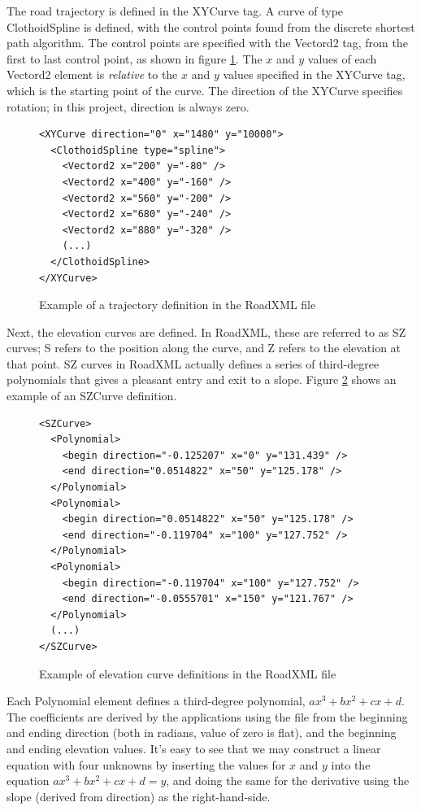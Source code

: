 The road trajectory is defined in the XYCurve tag\cite{roadxml}. A curve of type ClothoidSpline is defined, with the control points found from the discrete shortest path algorithm. The control points are specified with the Vectord2 tag, from the first to last control point, as shown in figure \ref{fig:roadxml_controlpoints}. The $x$ and $y$ values of each Vectord2 element is \textit{relative} to the $x$ and $y$ values specified in the XYCurve tag, which is the starting point of the curve. The direction of the XYCurve specifies rotation; in this project, direction is always zero.

\begin{figure}[ht]
\centering
\begin{verbatim}
<XYCurve direction="0" x="1480" y="10000">
  <ClothoidSpline type="spline">
    <Vectord2 x="200" y="-80" />
    <Vectord2 x="400" y="-160" />
    <Vectord2 x="560" y="-200" />
    <Vectord2 x="680" y="-240" />
    <Vectord2 x="880" y="-320" />
    (...)
  </ClothoidSpline>
</XYCurve>
\end{verbatim}
\caption{Example of a trajectory definition in the RoadXML file}
\label{fig:roadxml_controlpoints}
\end{figure}

Next, the elevation curves are defined. In RoadXML, these are referred to as SZ curves; S refers to the position along the curve, and Z refers to the elevation at that point. SZ curves in RoadXML actually defines a series of third-degree polynomials that gives a pleasant entry and exit to a slope. Figure \ref{fig:roadxml_elevation_curves} shows an example of an SZCurve definition. 

\begin{figure}[ht]
\centering
\begin{verbatim}
<SZCurve>
  <Polynomial>
    <begin direction="-0.125207" x="0" y="131.439" />
    <end direction="0.0514822" x="50" y="125.178" />
  </Polynomial>
  <Polynomial>
    <begin direction="0.0514822" x="50" y="125.178" />
    <end direction="-0.119704" x="100" y="127.752" />
  </Polynomial>
  <Polynomial>
    <begin direction="-0.119704" x="100" y="127.752" />
    <end direction="-0.0555701" x="150" y="121.767" />
  </Polynomial>
  (...)
</SZCurve>
\end{verbatim}
\caption{Example of elevation curve definitions in the RoadXML file}
\label{fig:roadxml_elevation_curves}
\end{figure}

Each Polynomial element defines a third-degree polynomial, $ax^3+bx^2+cx+d$. The coefficients are derived by the applications using the file from the beginning and ending direction (both in radians, value of zero is flat), and the beginning and ending elevation values. It's easy to see that we may construct a linear equation with four unknowns by inserting the values for $x$ and $y$ into the equation $ax^3+bx^2+cx+d = y$, and doing the same for the derivative using the slope (derived from direction) as the right-hand-side.

